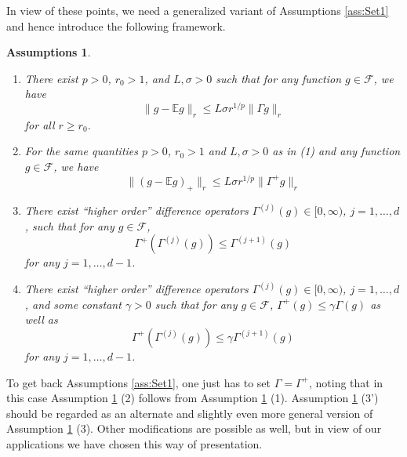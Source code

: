 \documentclass[a4paper,12pt]{amsart}
\numberwithin{equation}{section}
\newtheorem{assumptions}[satz]{Assumptions}
\theoremstyle{remark}
\def\E{{\mathbb E}}
\begin{document}
In view of these points, we need a generalized variant of Assumptions \ref{ass:Set1} and hence introduce the following framework.

\begin{assumptions}\label{ass:Set2}
	\begin{enumerate}
		\item There exist $p > 0$, $r_0 > 1$, and $L, \sigma > 0$ such that for any function $g \in \mathcal{F}$, we have
		\begin{equation*}%
			\lVert g - \E g \rVert_r \le L\sigma r^{1/p} \lVert \Gamma g \rVert_r
		\end{equation*}
		for all $r \ge r_0$.
		\item For the same quantities $p > 0$, $r_0 > 1$ and $L, \sigma > 0$ as in (1) and any function $g \in \mathcal{F}$, we have
		\begin{equation*}%
			\lVert (g - \E g)_+ \rVert_r \le L\sigma r^{1/p} \lVert \Gamma^+ g \rVert_r
		\end{equation*}
		\item There exist ``higher order'' difference operators $\Gamma^{(j)}(g) \in [0,\infty)$, $j = 1, \ldots, d$, such that for any $g \in \mathcal{F}$,
		\begin{equation*}%
			\Gamma^+ (\Gamma^{(j)}(g)) \le \Gamma^{(j+1)}(g)
		\end{equation*}
		for any $j = 1, \ldots, d-1$.
		\item[(3')] There exist ``higher order'' difference operators $\Gamma^{(j)}(g) \in [0,\infty)$, $j = 1, \ldots, d$, and some constant $\gamma > 0$ such that for any $g \in \mathcal{F}$, $\Gamma^+(g) \le \gamma \Gamma(g)$ as well as
		\begin{equation*}%
			\Gamma^+ (\Gamma^{(j)}(g)) \le \gamma \Gamma^{(j+1)}(g)
		\end{equation*}
		for any $j = 1, \ldots, d-1$.
	\end{enumerate}
\end{assumptions}

To get back Assumptions \ref{ass:Set1}, one just has to set $\Gamma = \Gamma^+$, noting that in this case Assumption \ref{ass:Set2} (2) follows from Assumption \ref{ass:Set2} (1). Assumption \ref{ass:Set2} (3') should be regarded as an alternate and slightly even more general version of Assumption \ref{ass:Set2} (3). Other modifications are possible as well, but in view of our applications we have chosen this way of presentation.
\end{document}
